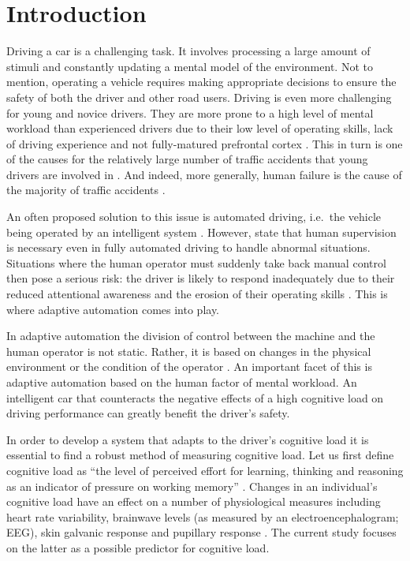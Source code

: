 
\section{Introduction}\label{sec:introduction}

Driving a car is a challenging task. 
It involves processing a large amount of stimuli and constantly updating a mental model of the environment.
Not to mention, operating a vehicle requires making appropriate decisions to ensure the safety of both the driver and other road users.
Driving is even more challenging for young and novice drivers. 
They are more prone to a high level of mental workload than experienced drivers due to their low level of operating skills, lack of driving experience \citep{Gregersen1996} and not fully-matured prefrontal cortex \citep{Ross2014}.
This in turn is one of the causes for the relatively large number of traffic accidents that young drivers are involved in \citep{Sena2013}.
And indeed, more generally, human failure is the cause of the majority of traffic accidents \citep{DeWaard1996}.

An often proposed solution to this issue is automated driving, i.e.\ the vehicle being operated by an intelligent system \citep{Cabrall2018}.
However, \citet{Brookhuis2007} state that human supervision is necessary even in fully automated driving to handle abnormal situations.
Situations where the human operator must suddenly take back manual control then pose a serious risk:
the driver is likely to respond inadequately due to their reduced attentional awareness and the erosion of their operating skills \citep{Dijksterhuis2012}.
This is where adaptive automation comes into play.

In adaptive automation the division of control between the machine and the human operator is not static.
Rather, it is based on changes in the physical environment or the condition of the operator \citep{Sheridan2011}.
An important facet of this is adaptive automation based on the human factor of mental workload.
An intelligent car that counteracts the negative effects of a high cognitive load on driving performance can greatly benefit the driver's safety.

In order to develop a system that adapts to the driver's cognitive load it is essential to find a robust method of measuring cognitive load.
Let us first define cognitive load as ``the level of perceived effort for learning, thinking and reasoning as an indicator of pressure on working memory'' \citep[p.~302]{Haapalainen2010}.
Changes in an individual's cognitive load have an effect on a number of physiological measures including heart rate variability, brainwave levels (as measured by an electroencephalogram; EEG), skin galvanic response and pupillary response \citep{Haapalainen2010}.
The current study focuses on the latter as a possible predictor for cognitive load.



